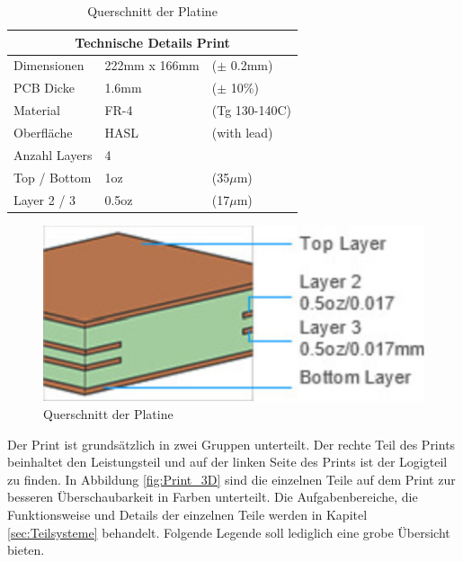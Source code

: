 \begin{table}[H]%
\centering
\parbox{0.5\textwidth}{
\begin{footnotesize}
\begin{tabular}{|l|ll|}
\hline
\multicolumn{3}{|c|}{\textbf{Technische Details Print}}\\
\hline
Dimensionen & 222mm x 166mm & ($\pm$ 0.2mm)\\
\hline
PCB Dicke & 1.6mm & ($\pm$ 10\%)\\
\hline
Material & FR-4 & (Tg 130-140C)\\
\hline
Oberfläche & HASL & (with lead)\\
\hline
Anzahl Layers & 4 & \\
\hline
Top / Bottom & 1oz & (35$\mu$m)\\
\hline
Layer 2 / 3 & 0.5oz & (17$\mu$m)\\
\hline
\end{tabular}
\end{footnotesize}
\caption{Spezifikationen der Platine \cite{jlcpcb_jlcpcb_2020}}
\label{tab:table}
}
\qquad
\begin{minipage}[c]{0.43\textwidth}%
\centering
\begin{figure}[H]
    \includegraphics[width=1\textwidth]{graphics/Print_Layers}
\caption{Querschnitt der Platine \cite{jlcpcb_jlcpcb_2020}}
\label{fig:figure}
\end{figure}
\end{minipage}
\end{table}

Der Print ist grundsätzlich in zwei Gruppen unterteilt. Der rechte Teil des Prints beinhaltet den Leistungsteil und auf der linken Seite des Prints ist der Logigteil zu finden. In Abbildung \ref{fig:Print_3D} sind die einzelnen Teile auf dem Print zur besseren Überschaubarkeit in Farben unterteilt. Die Aufgabenbereiche, die Funktionsweise und Details der einzelnen Teile werden in Kapitel \ref{sec:Teilsysteme} behandelt. Folgende Legende soll lediglich eine grobe Übersicht bieten.\\

